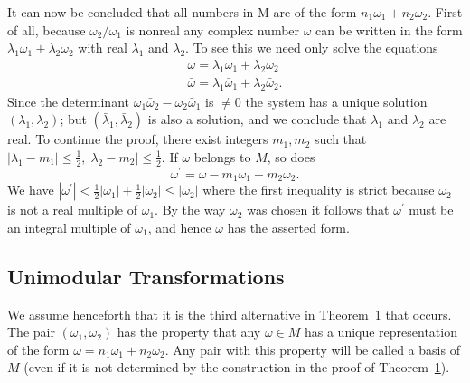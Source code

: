 It can now be concluded that all numbers in M are of the form $n_{1}\omega_{1} + n_{2}\omega_{2}$. First of all, because $\omega_{2}/\omega_{1}$ is nonreal any complex number $\omega$ can be written in the form $\lambda_{1}\omega_{1} + \lambda_{2}\omega_{2}$ with real $\lambda_{1}$ and $\lambda_{2}$. To see this we need only solve the equations
\begin{equation*}
\begin{array}{l} \omega = \lambda_ {1} \omega_ {1} + \lambda_ {2} \omega_ {2} \\ \bar {\omega} = \lambda_ {1} \bar {\omega} _ {1} + \lambda_ {2} \bar {\omega} _ {2}. \end{array}
\end{equation*}
Since the determinant $\omega_1\bar{\omega}_2 - \omega_2\bar{\omega}_1$ is $\neq 0$ the system has a unique solution $(\lambda_1,\lambda_2)$; but $(\bar{\lambda}_1,\bar{\lambda}_2)$ is also a solution, and we conclude that $\lambda_1$ and $\lambda_2$ are real. To continue the proof, there exist integers $m_1, m_2$ such that $|\lambda_1 - m_1| \leq \frac{1}{2}, |\lambda_2 - m_2| \leq \frac{1}{2}$. If $\omega$ belongs to $M$, so does
\begin{equation*}
\omega^ {\prime} = \omega - m _ {1} \omega_ {1} - m _ {2} \omega_ {2}.
\end{equation*}
We have $|\omega^{\prime}| < \frac{1}{2} |\omega_{1}| + \frac{1}{2} |\omega_{2}| \leq |\omega_{2}|$ where the first inequality is strict because $\omega_{2}$ is not a real multiple of $\omega_{1}$. By the way $\omega_{2}$ was chosen it follows that $\omega^{\prime}$ must be an integral multiple of $\omega_{1}$, and hence $\omega$ has the asserted form.

\setcounter{section}{2}\setcounter{subsection}{1}\subsection{Unimodular Transformations}\label{sec:7.2.2}
We assume henceforth that it is the third alternative in Theorem~\hyperref[thm:7.1]{1} that occurs. The pair $(\omega_{1},\omega_{2})$ has the property that any $\omega \in M$ has a unique representation of the form $\omega = n_1\omega_1 + n_2\omega_2$. Any pair with this property will be called a basis of $M$ (even if it is not determined by the construction in the proof of Theorem~\hyperref[thm:7.1]{1}).

